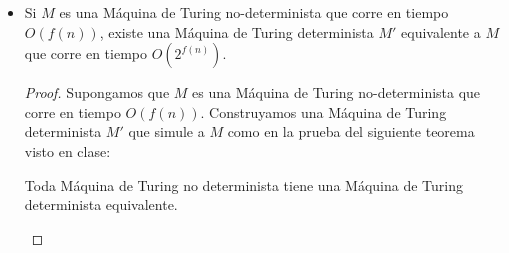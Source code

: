 \documentclass[letterpaper,10pt]{article}
\begin{document}
\begin{enumerate}
\begin{itemize}
\begin{proof}
             simulación. La etapa inicial, donde $M'$ pone su cinta en el
             formato adecuado, utiliza $O(n)$ pasos. Después, $M'$ simula
             cada uno de los $f(n)$ pasos de $M$, utilizando $O(f(n))$ pasos,
             por lo que esta parte de la simulación utiliza $f(n) x O(f(n)) $
             $= O(f(n)^{2})$ pasos. Por lo tanto, toda la simulación de $M$
             usa $O(n) + O(f(n)^{2})$ pasos. \\
             Hemos asumido que $f(n) \geq n$ (ya que $M$ ni siquiera podía leer 
             la entrada completa en menos tiempo). Por lo tanto, el tiempo de
             ejecución de $M'$ es $O(f(n)^{2})$. 
             
         \end{proof}
         
         \newpage
         
         \item Si $M$ es una Máquina de Turing no-determinista que corre en 
         tiempo $O(f(n))$, existe una Máquina de Turing determinista $M'$
         equivalente a $M$ que corre en tiempo $O(2^{f(n)})$.
         
         \begin{proof}
             Supongamos que $M$ es una Máquina de Turing no-determinista
             que corre en tiempo $O(f(n))$. Construyamos una Máquina de
             Turing determinista $M'$ que simule a $M$ como en la prueba
             del siguiente teorema visto en clase:
             
             \newtheorem{Teo}{Teorema}
             \begin{teo}
                 Toda Máquina de Turing no determinista tiene una Máquina
                 de Turing determinista equivalente.
             \end{teo}
             

\end{proof}
\end{itemize}
\end{enumerate}
\end{document}
